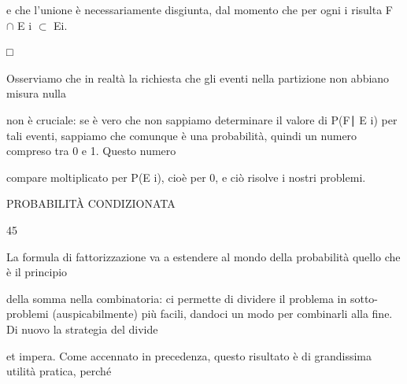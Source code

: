 \documentclass[a4paper,portrait,12pt]{article}
\begin{document}
\begin{flushleft}
e che l'unione \`{e} necessariamente disgiunta, dal momento che per ogni i risulta F $\cap$ E i $\subset$ Ei.
\end{flushleft}





□





\begin{flushleft}
Osserviamo che in realt\`{a} la richiesta che gli eventi nella partizione non abbiano misura nulla
\end{flushleft}


\begin{flushleft}
non \`{e} cruciale: se \`{e} vero che non sappiamo determinare il valore di P(F∣ E i) per tali eventi, sappiamo che comunque \`{e} una probabilit\`{a}, quindi un numero compreso tra 0 e 1. Questo numero
\end{flushleft}


\begin{flushleft}
compare moltiplicato per P(E i), cio\`{e} per 0, e ci\`{o} risolve i nostri problemi.
\end{flushleft}





\begin{flushleft}
\newpage
PROBABILIT\`{A} CONDIZIONATA
\end{flushleft}





45





\begin{flushleft}
La formula di fattorizzazione va a estendere al mondo della probabilit\`{a} quello che \`{e} il principio
\end{flushleft}


\begin{flushleft}
della somma nella combinatoria: ci permette di dividere il problema in sotto-problemi (auspicabilmente) più facili, dandoci un modo per combinarli alla fine. Di nuovo la strategia del divide
\end{flushleft}


\begin{flushleft}
et impera. Come accennato in precedenza, questo risultato \`{e} di grandissima utilit\`{a} pratica, perch\'{e}
\end{flushleft}
\end{document}
